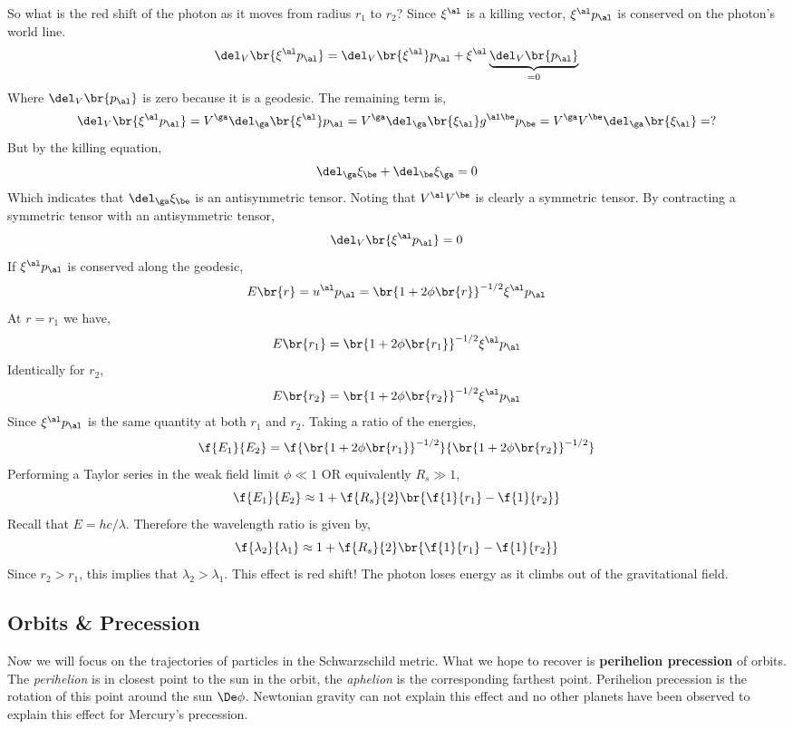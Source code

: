 \documentclass{article}
\begin{document}
So what is the red shift of the photon as it moves from radius $r_1$ to $r_2$? Since $\xi^\al$ is a killing vector, $\xi^\al p_\al$ is conserved on the photon's world line.
\[ \del_{V}\br{\xi^\al p_\al} = \del_{V}\br{\xi^\al} p_\al + \xi^\al \underbrace{\del_{V}\br{p_\al}}_{=0} \]
Where $\del_{V}\br{p_\al}$ is zero because it is a geodesic. The remaining term is,
\[ \del_{V}\br{\xi^\al p_\al} = V^\ga \del_{\ga}\br{\xi^\al} p_\al = V^\ga \del_{\ga}\br{\xi_\al} g^{\al\be} p_\be = V^\ga V^\be \del_{\ga}\br{\xi_\al} = ? \]
But by the killing equation,
\[ \del_\ga \xi_\be + \del_\be \xi_\ga = 0 \]
Which indicates that $\del_\ga \xi_\be$ is an antisymmetric tensor. Noting that $V^\al V^\be$ is clearly a symmetric tensor. By contracting a symmetric tensor with an antisymmetric tensor,
\[ \del_{V}\br{\xi^\al p_\al} = 0 \]
If $\xi^\al p_\al$ is conserved along the geodesic,
\[ E\br{r} = u^\al p_\al = \br{1+2\phi\br{r}}^{-1/2} \xi^\al p_\al \]
At $r=r_1$ we have,
\[ E\br{r_1} = \br{1+2\phi\br{r_1}}^{-1/2} \xi^\al p_\al \]
Identically for $r_2$,
\[ E\br{r_2} = \br{1+2\phi\br{r_2}}^{-1/2} \xi^\al p_\al \]
Since $\xi^\al p_\al$ is the same quantity at both $r_1$ and $r_2$. Taking a ratio of the energies,
\[ \f{E_1}{E_2} = \f{\br{1+2\phi\br{r_1}}^{-1/2}}{\br{1+2\phi\br{r_2}}^{-1/2}} \]
Performing a Taylor series in the weak field limit $\phi \ll 1$ OR equivalently $R_s \gg 1$,
\[ \f{E_1}{E_2} \approx 1+\f{R_s}{2}\br{\f{1}{r_1} - \f{1}{r_2}} \]
Recall that $E = hc /\lambda$. Therefore the wavelength ratio is given by,
\[ \f{\lambda_2}{\lambda_1} \approx 1+\f{R_s}{2}\br{\f{1}{r_1} - \f{1}{r_2}} \]
Since $r_2 > r_1$, this implies that $\lambda_2 > \lambda_1$. This effect is red shift! The photon loses energy as it climbs out of the gravitational field.

\subsection{Orbits \& Precession}
Now we will focus on the trajectories of particles in the Schwarzschild metric. What we hope to recover is \textbf{perihelion precession} of orbits. The \textit{perihelion} is in closest point to the sun in the orbit, the \textit{aphelion} is the corresponding farthest point. Perihelion precession is the rotation of this point around the sun $\De \phi$. Newtonian gravity can not explain this effect and no other planets have been observed to explain this effect for Mercury's precession.\\
\end{document}
